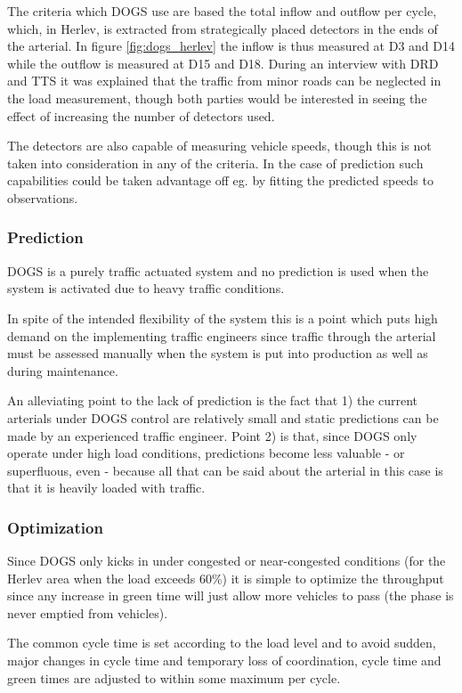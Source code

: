 The criteria which DOGS use are based the total inflow and outflow per cycle, which, in Herlev, is extracted from strategically placed detectors in the ends of the arterial. In figure \ref{fig:dogs_herlev} the inflow is thus measured at D3 and D14 while the outflow is measured at D15 and D18. 
During an interview with DRD and TTS it was explained that the traffic from minor roads can be neglected in the load measurement, though both parties would be interested in seeing the effect of increasing the number of detectors used.

The detectors are also capable of measuring vehicle speeds, though this is not taken into consideration in any of the criteria. In the case of prediction such capabilities could be taken advantage off eg. by fitting the predicted speeds to observations.

\subsubsection*{Prediction}
DOGS is a purely traffic actuated system and no prediction is used when the system is activated due to heavy traffic conditions.

In spite of the intended flexibility of the system this is a point which puts high demand on the implementing traffic engineers since traffic through the arterial must be assessed manually when the system is put into production as well as during maintenance.

An alleviating point to the lack of prediction is the fact that 1) the current arterials under DOGS control are relatively small and static predictions can be made by an experienced traffic engineer. Point 2) is that, since DOGS only operate under high load conditions, predictions become less valuable - or superfluous, even - because all that can be said about the arterial in this case is that it is heavily loaded with traffic.

\subsubsection*{Optimization}
Since DOGS only kicks in under congested or near-congested conditions (for the Herlev area when the load exceeds 60\%) it is simple to optimize the throughput since any increase in green time will just allow more vehicles to pass (the phase is never emptied from vehicles).

The common cycle time is set according to the load level and to avoid sudden, major changes in cycle time and temporary loss of coordination, cycle time and green times are adjusted to within some maximum per cycle. 

